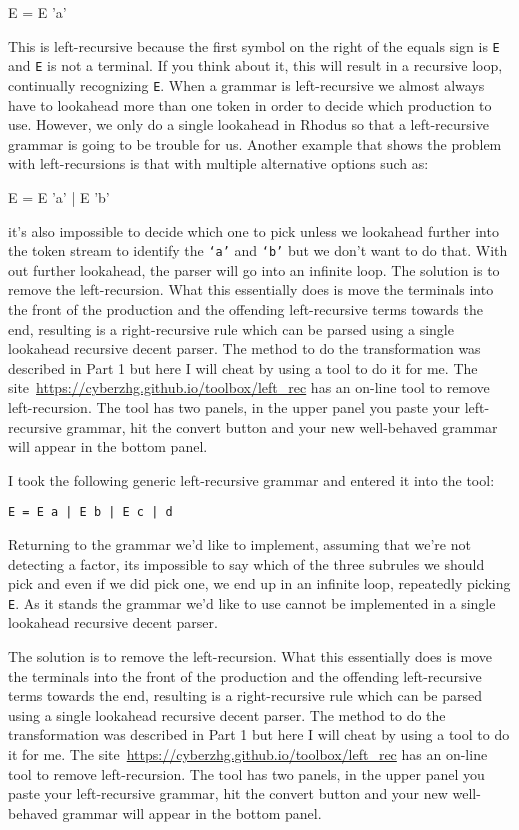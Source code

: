 \begin{lcverbatim}
E = E 'a'
\end{lcverbatim}
%
This is left-recursive because the first symbol on the right of the equals sign is {\tt E} and {\tt E} is not a terminal. If you think about it, this will result in a recursive loop, continually recognizing {\tt E}. When a grammar is left-recursive we almost always have to lookahead more than one token in order to decide which production to use. However, we only do a single lookahead in Rhodus so that a left-recursive grammar is going to be trouble for us. Another example that shows the problem with left-recursions is that with multiple alternative options such as:
%
\begin{lcverbatim}
E  = E 'a'
   | E 'b'
\end{lcverbatim}
%
it's also impossible to decide which one to pick unless we lookahead further into the token stream to identify the {\tt `a'} and {\tt `b'} but we don't want to do that. With out further lookahead, the parser will go into an infinite loop. The solution is to remove the left-recursion. What this essentially does is move the terminals into the front of the production and the offending left-recursive terms towards the end, resulting is a right-recursive rule which can be parsed using a single lookahead recursive decent parser. The method to do the transformation was described in Part 1 but here I will cheat by using a tool to do it for me. The site~\url{https://cyberzhg.github.io/toolbox/left_rec} has an on-line tool to remove left-recursion. The tool has two panels, in the upper panel you paste your left-recursive grammar, hit the convert button and your new well-behaved grammar will appear in the bottom panel.

I took the following generic left-recursive grammar and entered it into the tool:

{\tt  E = E a | E b | E c | d}

Returning to the grammar we'd like to implement, assuming that we're not detecting a factor, its impossible to say which of the three subrules we should pick and even if we did pick one, we end up in an infinite loop, repeatedly picking {\tt E}. As it stands the grammar we'd like to use cannot be implemented in a single lookahead recursive decent parser.

The solution is to remove the left-recursion. What this essentially does is move the terminals into the front of the production and the offending left-recursive terms towards the end, resulting is a right-recursive rule which can be parsed using a single lookahead recursive decent parser. The method to do the transformation was described in Part 1 but here I will cheat by using a tool to do it for me. The site~\url{https://cyberzhg.github.io/toolbox/left_rec} has an on-line tool to remove left-recursion. The tool has two panels, in the upper panel you paste your left-recursive grammar, hit the convert button and your new well-behaved grammar will appear in the bottom panel.

